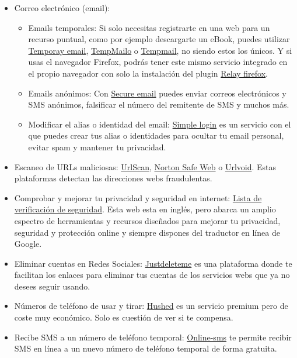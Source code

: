 \documentclass[
  spanish,
  a4paper,
  openany]{book}
\begin{document}
\begin{itemize}
\item
  Correo electrónico (email):

  \begin{itemize}
  \item
    Emails temporales: Si solo necesitas registrarte en una web para un recurso puntual, como por ejemplo descargarte un eBook, puedes utilizar \href{https://temp-mail.org/es/}{Temporay email}, \href{https://tempmailo.com/}{TempMailo} o \href{https://temp-mail.io/es}{Tempmail}, no siendo estos los únicos. Y si usas el navegador Firefox, podrás tener este mismo servicio integrado en el propio navegador con solo la instalación del plugin \href{https://relay.firefox.com}{Relay firefox}.
  \item
    Emails anónimos: Con \href{https://www.secure-email.org/index.php}{Secure email} puedes enviar correos electrónicos y SMS anónimos, falsificar el número del remitente de SMS y muchos más.
  \item
    Modificar el alias o identidad del email: \href{https://simplelogin.io/}{Simple login} es un servicio con el que puedes crear tus alias o identidades para ocultar tu email personal, evitar spam y mantener tu privacidad.
  \end{itemize}
\item
  Escaneo de URLs maliciosas: \href{https://urlscan.io/}{UrlScan}, \href{https://safeweb.norton.com/}{Norton Safe Web} o \href{https://www.urlvoid.com/}{Urlvoid}. Estas plataformas detectan las direcciones webs fraudulentas.
\item
  Comprobar y mejorar tu privacidad y seguridad en internet: \href{https://securitycheckli.st/}{Lista de verificación de seguridad}. Esta web esta en inglés, pero abarca un amplio espectro de herramientas y recursos diseñados para mejorar tu privacidad, seguridad y protección online y siempre dispones del traductor en línea de Google.
\item
  Eliminar cuentas en Redes Sociales: \href{https://justdeleteme.xyz/}{Justdeleteme} es una plataforma donde te facilitan los enlaces para eliminar tus cuentas de los servicios webs que ya no desees seguir usando.
\item
  Números de teléfono de usar y tirar: \href{https://hushed.com}{Hushed} es un servicio premium pero de coste muy económico. Solo es cuestión de ver si te compensa.
\item
  Recibe SMS a un número de teléfono temporal: \href{https://online-sms.org/es}{Online-sms} te permite recibir SMS en línea a un nuevo número de teléfono temporal de forma gratuita.

\end{itemize}
\end{document}
